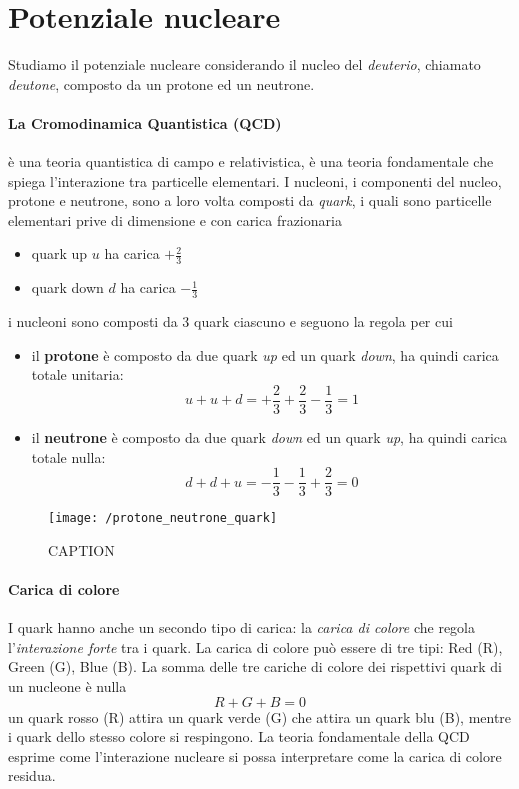 
\section{Potenziale nucleare}
Studiamo il potenziale nucleare considerando il nucleo del \emph{deuterio}, chiamato \emph{deutone}, composto da un protone ed un neutrone.

\paragraph{La Cromodinamica Quantistica (QCD)} è una teoria quantistica di campo e relativistica, è una teoria fondamentale che spiega l'interazione tra particelle elementari.
I nucleoni, i componenti del nucleo, protone e neutrone, sono a loro volta composti da \emph{quark}, i quali sono particelle elementari prive di dimensione e con carica frazionaria
\begin{itemize}
\item quark up $u$ ha carica $+\frac{2}{3}$
\item quark down $d$ ha carica $-\frac{1}{3}$
\end{itemize}
i nucleoni sono composti da 3 quark ciascuno e seguono la regola per cui
\begin{itemize}
\item il \textbf{protone} è composto da due quark \emph{up} ed un quark \emph{down}, ha quindi carica totale unitaria:
$$u+u+d = +\frac{2}{3} +\frac{2}{3} -\frac{1}{3} = 1$$
\item il \textbf{neutrone} è composto da due quark \emph{down} ed un quark \emph{up}, ha quindi carica totale nulla:
$$d+d+u = -\frac{1}{3} -\frac{1}{3} +\frac{2}{3} = 0$$
\end{itemize}
\begin{figure}[h]
\centering
\texttt{[image: /protone\_neutrone\_quark]}
\caption{CAPTION}
\end{figure}

\paragraph{Carica di colore} I quark hanno anche un secondo tipo di carica: la \emph{carica di colore} che regola l'\emph{interazione forte} tra i quark.
La carica di colore può essere di tre tipi: Red (R), Green (G), Blue (B).
La somma delle tre cariche di colore dei rispettivi quark di un nucleone è nulla
\begin{equation}
R + G + B = 0
\end{equation}
un quark rosso (R) attira un quark verde (G) che attira un quark blu (B), mentre i quark dello stesso colore si respingono.
La teoria fondamentale della QCD esprime come l'interazione nucleare si possa interpretare come la carica di colore residua.

